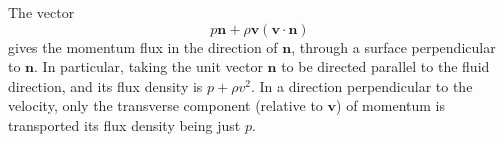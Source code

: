 \documentclass[conference]{IEEEtran}
\theoremstyle{definition}
\theoremstyle{remark}
\begin{document}
    The vector
    \begin{equation}
        p \mathbf{n} + \rho \mathbf{v} (\mathbf{v} \cdot \mathbf{n})
    \end{equation}
    gives the momentum flux in the direction of $\mathbf{n}$, through a surface perpendicular to $\mathbf{n}$. In particular, taking the unit vector $\mathbf{n}$ to be directed parallel to the fluid direction, and its flux density is $p + \rho v^2$. In a direction perpendicular to the velocity, only the transverse component (relative to $\mathbf{v}$) of momentum is transported its flux density being just $p$.
    
\end{document}
